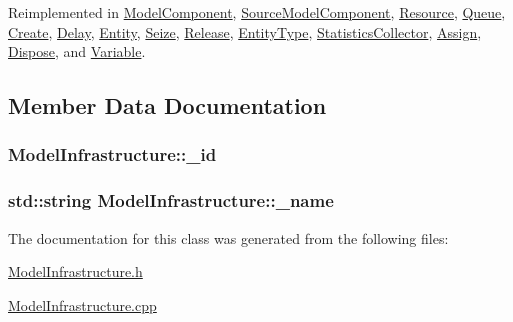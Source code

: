 Reimplemented in \hyperlink{class_model_component_ad8bc846e36b028eab7efb7da6c549eca}{Model\-Component}, \hyperlink{class_source_model_component_a4011597b5780fcc0495e8e22ab8158f6}{Source\-Model\-Component}, \hyperlink{class_resource_a593cf83404dc90706943b4e60213fd01}{Resource}, \hyperlink{class_queue_ac78cc84cd91539c7f38d95dc17dabac5}{Queue}, \hyperlink{class_create_a8d1832d2165bbeea4a5a88aded883f86}{Create}, \hyperlink{class_delay_af8187e4515417b547dc22b5ee0a1f95d}{Delay}, \hyperlink{class_entity_a86cc324050b451b31b134943e7978e36}{Entity}, \hyperlink{class_seize_a495ace3a156680b5816c8b285135322c}{Seize}, \hyperlink{class_release_a1ec7b35553820f0f228f31be1df468c3}{Release}, \hyperlink{class_entity_type_ab5a696912b12a9f51decded90f368dea}{Entity\-Type}, \hyperlink{class_statistics_collector_a7ce8dad7e29d06c73a01d2ddee93fe00}{Statistics\-Collector}, \hyperlink{class_assign_af5022b92204adcd9ee3e444b7e316d07}{Assign}, \hyperlink{class_dispose_aee8ef98d5ca22eb18a97b258ed059865}{Dispose}, and \hyperlink{class_variable_a8bd0a772bb32fd630e252306306cd154}{Variable}.



\subsection{Member Data Documentation}
\hypertarget{class_model_infrastructure_af6fe00f683f5e29cbcd667e4d3bd24d0}{
\subsubsection[{\-\_\-id}]{ Model\-Infrastructure\-::\-\_\-id\hspace{0.3cm}{\ttfamily [protected]}}}\label{class_model_infrastructure_af6fe00f683f5e29cbcd667e4d3bd24d0}
\hypertarget{class_model_infrastructure_aa73c0444ba8e3515e2aec3154eaad85d}{
\subsubsection[{\-\_\-name}]{\setlength{\rightskip}{0pt plus 5cm}std\-::string Model\-Infrastructure\-::\-\_\-name\hspace{0.3cm}{\ttfamily [protected]}}}\label{class_model_infrastructure_aa73c0444ba8e3515e2aec3154eaad85d}


The documentation for this class was generated from the following files\-:\begin{DoxyCompactItemize}
\item 
\hyperlink{_model_infrastructure_8h}{Model\-Infrastructure.\-h}\item 
\hyperlink{_model_infrastructure_8cpp}{Model\-Infrastructure.\-cpp}\end{DoxyCompactItemize}
